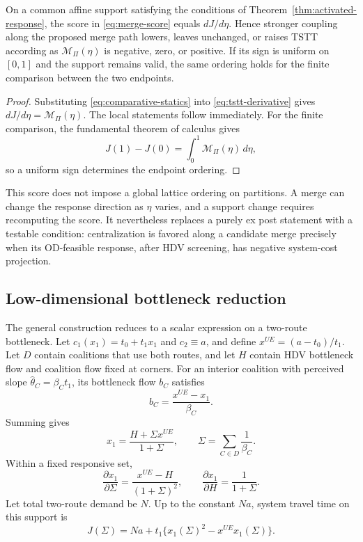 \begin{proposition}\label{prop:merge-regimes}
On a common affine support satisfying the conditions of
Theorem~\ref{thm:activated-response}, the score in
\eqref{eq:merge-score} equals $dJ/d\eta$. Hence stronger coupling along the
proposed merge path lowers, leaves unchanged, or raises TSTT according as
$\mathcal M_\Pi(\eta)$ is negative, zero, or positive. If its sign is uniform
on $[0,1]$ and the support remains valid, the same ordering holds for the
finite comparison between the two endpoints.
\end{proposition}

\begin{proof}
Substituting \eqref{eq:comparative-statics} into
\eqref{eq:tstt-derivative} gives
$dJ/d\eta=\mathcal M_\Pi(\eta)$. The local statements follow immediately.
For the finite comparison, the fundamental theorem of calculus gives
\[
 J(1)-J(0)=\int_0^1\mathcal M_\Pi(\eta)\,d\eta,
\]
so a uniform sign determines the endpoint ordering.
\end{proof}

This score does not impose a global lattice ordering on partitions. A merge
can change the response direction as $\eta$ varies, and a support change
requires recomputing the score. It nevertheless replaces a purely ex post
statement with a testable condition: centralization is favored along a
candidate merge precisely when its OD-feasible response, after HDV screening,
has negative system-cost projection.

\subsection{Low-dimensional bottleneck reduction}\label{sec:bottleneck-reduction}

The general construction reduces to a scalar expression on a two-route bottleneck. Let $c_1(x_1)=t_0+t_1x_1$ and $c_2\equiv a$, and define $x^{UE}=(a-t_0)/t_1$. Let $D$ contain coalitions that use both routes, and let $H$ contain HDV bottleneck flow and coalition flow fixed at corners. For an interior coalition with perceived slope $\widehat\theta_C=\beta_Ct_1$, its bottleneck flow $b_C$ satisfies
\[
 b_C=\frac{x^{UE}-x_1}{\beta_C}.
\]
Summing gives
\begin{equation}\label{eq:xHSigma}
 x_1=\frac{H+\Sigma x^{UE}}{1+\Sigma},
 \qquad \Sigma=\sum_{C\in D}\frac1{\beta_C}.
\end{equation}
Within a fixed responsive set,
\[
 \frac{\partial x_1}{\partial\Sigma}=\frac{x^{UE}-H}{(1+\Sigma)^2},
 \qquad
 \frac{\partial x_1}{\partial H}=\frac1{1+\Sigma}.
\]
Let total two-route demand be $N$. Up to the constant $Na$, system travel time
on this support is
\begin{equation}\label{eq:bottleneck-tstt-sigma}
 J(\Sigma)=Na+t_1\{x_1(\Sigma)^2-x^{UE}x_1(\Sigma)\}.
\end{equation}

